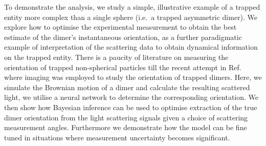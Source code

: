 \documentclass[final,  3p]{elsarticle}
\begin{document}
To demonstrate the analysis, we study a simple, illustrative example of a trapped entity more complex than a single sphere (i.e.\ a trapped asymmetric dimer).  We explore how to optimise the experimental measurement to obtain the best estimate of the dimer's instantaneous orientation, as a further paradigmatic example of interpretation of the scattering data to obtain dynamical information on the trapped entity. There is a paucity of literature on measuring the orientation of trapped non-spherical particles till the recent attempt in Ref.~\cite{raudsepp2022estimating} where imaging was employed to study the orientation of trapped dimers. Here, we simulate the Brownian motion of a dimer and calculate the resulting scattered light, we utilise a neural network to determine the corresponding orientation. We then show how Bayesian inference can be used to optimise extraction of the true dimer orientation from the light scattering signals given a choice of scattering measurement angles. Furthermore we demonstrate how the model can be fine tuned in situations where measurement uncertainty becomes significant. 
\end{document}
